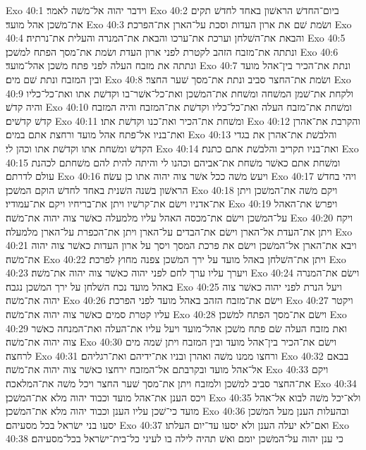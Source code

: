 Exo 40:1  וידבר יהוה אל־משׁה לאמר׃
Exo 40:2  ביום־החדשׁ הראשׁון באחד לחדשׁ תקים את־משׁכן אהל מועד׃
Exo 40:3  ושׂמת שׁם את ארון העדות וסכת על־הארן את־הפרכת׃
Exo 40:4  והבאת את־השׁלחן וערכת את־ערכו והבאת את־המנרה והעלית את־נרתיה׃
Exo 40:5  ונתתה את־מזבח הזהב לקטרת לפני ארון העדת ושׂמת את־מסך הפתח למשׁכן׃
Exo 40:6  ונתתה את מזבח העלה לפני פתח משׁכן אהל־מועד׃
Exo 40:7  ונתת את־הכיר בין־אהל מועד ובין המזבח ונתת שׁם מים׃
Exo 40:8  ושׂמת את־החצר סביב ונתת את־מסך שׁער החצר׃
Exo 40:9  ולקחת את־שׁמן המשׁחה ומשׁחת את־המשׁכן ואת־כל־אשׁר־בו וקדשׁת אתו ואת־כל־כליו והיה קדשׁ׃
Exo 40:10  ומשׁחת את־מזבח העלה ואת־כל־כליו וקדשׁת את־המזבח והיה המזבח קדשׁ קדשׁים׃
Exo 40:11  ומשׁחת את־הכיר ואת־כנו וקדשׁת אתו׃
Exo 40:12  והקרבת את־אהרן ואת־בניו אל־פתח אהל מועד ורחצת אתם במים׃
Exo 40:13  והלבשׁת את־אהרן את בגדי הקדשׁ ומשׁחת אתו וקדשׁת אתו וכהן לי׃
Exo 40:14  ואת־בניו תקריב והלבשׁת אתם כתנת׃
Exo 40:15  ומשׁחת אתם כאשׁר משׁחת את־אביהם וכהנו לי והיתה להית להם משׁחתם לכהנת עולם לדרתם׃
Exo 40:16  ויעשׂ משׁה ככל אשׁר צוה יהוה אתו כן עשׂה׃
Exo 40:17  ויהי בחדשׁ הראשׁון בשׁנה השׁנית באחד לחדשׁ הוקם המשׁכן׃
Exo 40:18  ויקם משׁה את־המשׁכן ויתן את־אדניו וישׂם את־קרשׁיו ויתן את־בריחיו ויקם את־עמודיו׃
Exo 40:19  ויפרשׂ את־האהל על־המשׁכן וישׂם את־מכסה האהל עליו מלמעלה כאשׁר צוה יהוה את־משׁה׃
Exo 40:20  ויקח ויתן את־העדת אל־הארן וישׂם את־הבדים על־הארן ויתן את־הכפרת על־הארן מלמעלה׃
Exo 40:21  ויבא את־הארן אל־המשׁכן וישׂם את פרכת המסך ויסך על ארון העדות כאשׁר צוה יהוה את־משׁה׃
Exo 40:22  ויתן את־השׁלחן באהל מועד על ירך המשׁכן צפנה מחוץ לפרכת׃
Exo 40:23  ויערך עליו ערך לחם לפני יהוה כאשׁר צוה יהוה את־משׁה׃
Exo 40:24  וישׂם את־המנרה באהל מועד נכח השׁלחן על ירך המשׁכן נגבה׃
Exo 40:25  ויעל הנרת לפני יהוה כאשׁר צוה יהוה את־משׁה׃
Exo 40:26  וישׂם את־מזבח הזהב באהל מועד לפני הפרכת׃
Exo 40:27  ויקטר עליו קטרת סמים כאשׁר צוה יהוה את־משׁה׃
Exo 40:28  וישׂם את־מסך הפתח למשׁכן׃
Exo 40:29  ואת מזבח העלה שׂם פתח משׁכן אהל־מועד ויעל עליו את־העלה ואת־המנחה כאשׁר צוה יהוה את־משׁה׃
Exo 40:30  וישׂם את־הכיר בין־אהל מועד ובין המזבח ויתן שׁמה מים לרחצה׃
Exo 40:31  ורחצו ממנו משׁה ואהרן ובניו את־ידיהם ואת־רגליהם׃
Exo 40:32  בבאם אל־אהל מועד ובקרבתם אל־המזבח ירחצו כאשׁר צוה יהוה את־משׁה׃
Exo 40:33  ויקם את־החצר סביב למשׁכן ולמזבח ויתן את־מסך שׁער החצר ויכל משׁה את־המלאכה׃
Exo 40:34  ויכס הענן את־אהל מועד וכבוד יהוה מלא את־המשׁכן׃
Exo 40:35  ולא־יכל משׁה לבוא אל־אהל מועד כי־שׁכן עליו הענן וכבוד יהוה מלא את־המשׁכן׃
Exo 40:36  ובהעלות הענן מעל המשׁכן יסעו בני ישׂראל בכל מסעיהם׃
Exo 40:37  ואם־לא יעלה הענן ולא יסעו עד־יום העלתו׃
Exo 40:38  כי ענן יהוה על־המשׁכן יומם ואשׁ תהיה לילה בו לעיני כל־בית־ישׂראל בכל־מסעיהם׃


